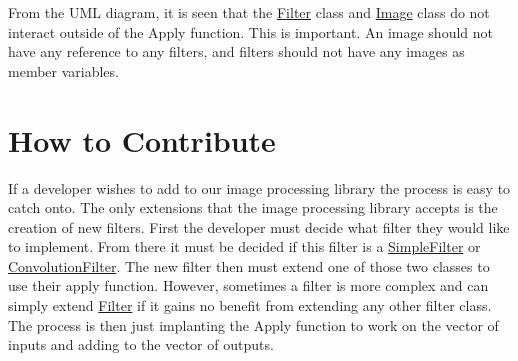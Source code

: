 From the U\+ML diagram, it is seen that the \hyperlink{classFilter}{Filter} class and \hyperlink{classImage}{Image} class do not interact outside of the Apply function. This is important. An image should not have any reference to any filters, and filters should not have any images as member variables.\hypertarget{image_processing_description_image_processing_contribute}{}\section{How to Contribute}\label{image_processing_description_image_processing_contribute}
If a developer wishes to add to our image processing library the process is easy to catch onto. The only extensions that the image processing library accepts is the creation of new filters. First the developer must decide what filter they would like to implement. From there it must be decided if this filter is a \hyperlink{classSimpleFilter}{Simple\+Filter} or \hyperlink{classConvolutionFilter}{Convolution\+Filter}. The new filter then must extend one of those two classes to use their apply function. However, sometimes a filter is more complex and can simply extend \hyperlink{classFilter}{Filter} if it gains no benefit from extending any other filter class. The process is then just implanting the Apply function to work on the vector of inputs and adding to the vector of outputs. 